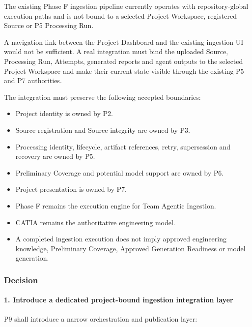 The existing Phase F ingestion pipeline currently operates with repository-global execution paths and is not bound to a selected Project Workspace, registered Source or P5 Processing Run.

A navigation link between the Project Dashboard and the existing ingestion UI would not be sufficient. A real integration must bind the uploaded Source, Processing Run, Attempts, generated reports and agent outputs to the selected Project Workspace and make their current state visible through the existing P5 and P7 authorities.

The integration must preserve the following accepted boundaries:

\begin{itemize}
\tightlist
\item
  Project identity is owned by P2.
\item
  Source registration and Source integrity are owned by P3.
\item
  Processing identity, lifecycle, artifact references, retry, supersession and recovery are owned by P5.
\item
  Preliminary Coverage and potential model support are owned by P6.
\item
  Project presentation is owned by P7.
\item
  Phase F remains the execution engine for Team Agentic Ingestion.
\item
  CATIA remains the authoritative engineering model.
\item
  A completed ingestion execution does not imply approved engineering knowledge, Preliminary Coverage, Approved Generation Readiness or model generation.
\end{itemize}

\hypertarget{decision}{%
\subsubsection{Decision}\label{decision}}

\hypertarget{1-introduce-a-dedicated-project-bound-ingestion-integration-layer}{%
\paragraph{1. Introduce a dedicated project-bound ingestion integration layer}\label{1-introduce-a-dedicated-project-bound-ingestion-integration-layer}}

P9 shall introduce a narrow orchestration and publication layer:

